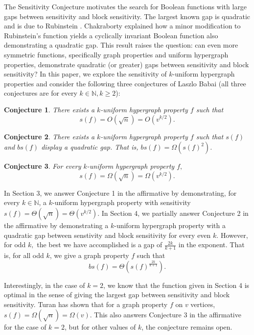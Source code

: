 \documentclass[psamsfonts]{amsart}
\newtheorem{conj}{Conjecture}
\theoremstyle{definition}
\theoremstyle{remark}
\numberwithin{equation}{section}
\begin{document}
The Sensitivity Conjecture motivates the search for Boolean functions with large gaps between sensitivity and block sensitivity. The largest known gap is quadratic and is due to Rubinstein \cite{R}. Chakraborty \cite{C} explained how a minor modification to Rubinstein's function yields a cyclically invariant Boolean function also demonstrating a quadratic gap. This result raises the question: can even more symmetric functions, specifically graph properties and uniform hypergraph properties, demonstrate quadratic (or greater) gaps between sensitivity and block sensitivity? In this paper, we explore the sensitivity of $k$-uniform hypergraph properties and consider the following three conjectures of Laszlo Babai (all three conjectures are for every $k \in \mathbb{N}, k\geq 2$):

\begin{conj}
There exists a $k$-uniform hypergraph property $f$ such that $$s(f)=O(\sqrt{n})=O(v^{k/2}).$$
\end{conj}

\begin{conj}
There exists a $k$-uniform hypergraph property $f$ such that $s(f)$ and $bs(f)$ display a quadratic gap. That is,  $bs(f)=\Omega(s(f)^2)$.
\end{conj}

\begin{conj}
For every $k$-uniform hypergraph property $f,$ $$s(f)=\Omega(\sqrt{n})=\Omega(v^{k/2}).$$
\end{conj}

In Section 3, we answer Conjecture 1 in the affirmative by demonstrating, for every $k \in \mathbb{N}$, a $k$-uniform hypergraph property with sensitivity $s(f)=\Theta(\sqrt{n})=\Theta(v^{k/2})$. In Section 4, we partially answer Conjecture 2 in the affirmative by demonstrating a $k$-uniform hypergraph property with a quadratic gap between senstivity and block sensitivity for every even $k$.  However, for odd $k,$ the best we have accomplished is a gap of $\frac{2k}{k+1}$ in the exponent.  That is, for all odd $k$, we give a graph property $f$ such that 
$$bs(f)=\Theta(s(f)^{\frac{2k}{k+1}}).$$

Interestingly, in the case of $k=2$, we know that the function given in Section 4 is optimal in the sense of giving the largest gap between sensitivity and block sensitivity.  Turan \cite{T} has shown that for a graph property $f$ on $v$ vertices, $s(f) = \Omega(\sqrt{n})=\Omega(v)$. This also answers Conjecture 3 in the affirmative for the case of $k=2$, but for other values of $k$, the conjecture remains open. 
\end{document}
